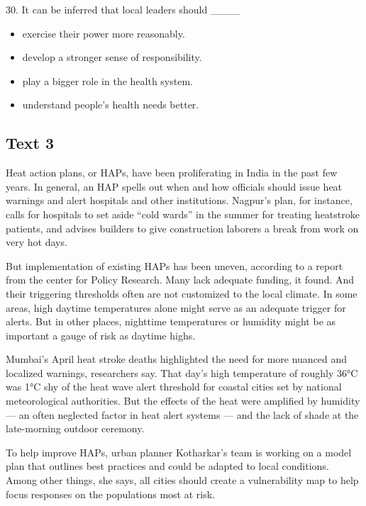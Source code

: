 \documentclass[UTF8,11pt]{ctexart}
\begin{document}
30. It can be inferred that local leaders should \_\_\_\_


\begin{itemize}[leftmargin=2em,itemsep=.2em,topsep=.4em]\item[A.] exercise their power more reasonably.
\item[B.] develop a stronger sense of responsibility.
\item[C.] play a bigger role in the health system.
\item[D.] understand people’s health needs better.
\end{itemize}

\subsection*{\textbf{Text 3}}


Heat action plans, or HAPs, have been proliferating in India in the past few years. In general, an HAP spells out when and how officials should issue heat warnings and alert hospitals and other institutions. Nagpur’s plan, for instance, calls for hospitals to set aside “cold wards” in the summer for treating heatstroke patients, and advises builders to give construction laborers a break from work on very hot days.


But implementation of existing HAPs has been uneven, according to a report from the center for Policy Research. Many lack adequate funding, it found. And their triggering thresholds often are not customized to the local climate. In some areas, high daytime temperatures alone might serve as an adequate trigger for alerts. But in other places, nighttime temperatures or humidity might be as important a gauge of risk as daytime highs.


Mumbai’s April heat stroke deaths highlighted the need for more nuanced and localized warnings, researchers say. That day’s high temperature of roughly 36°C was 1°C shy of the heat wave alert threshold for coastal cities set by national meteorological authorities. But the effects of the heat were amplified by humidity — an often neglected factor in heat alert systems — and the lack of shade at the late-morning outdoor ceremony.


To help improve HAPs, urban planner Kotharkar’s team is working on a model plan that outlines best practices and could be adapted to local conditions. Among other things, she says, all cities should create a vulnerability map to help focus responses on the populations most at risk.
\end{document}
